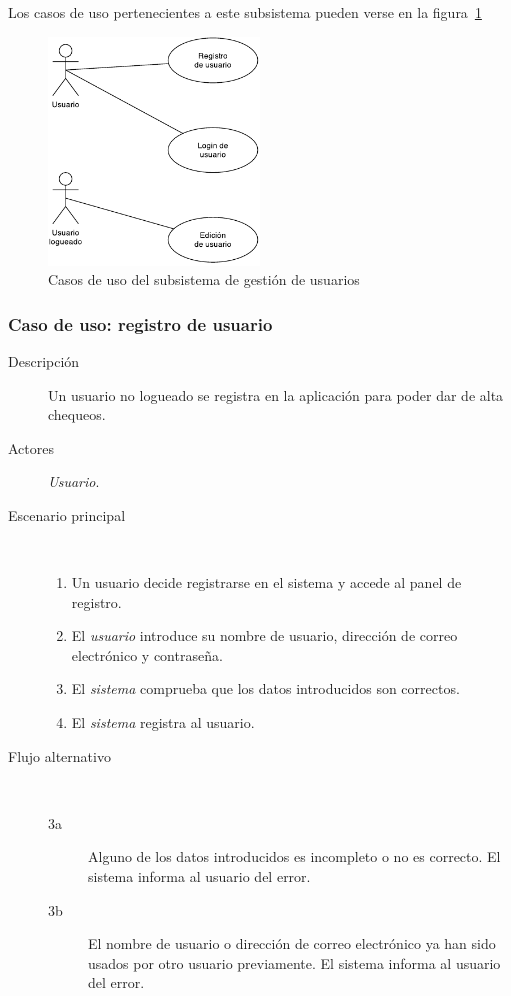 Los casos de uso pertenecientes a este subsistema pueden verse en la
figura~\ref{fig:subsistema-usuarios}

\begin{figure}[hp]
  \centering
  \includegraphics[width=0.5\textwidth]{4_analisis/diagrama_subsistema_gestion_usuarios}
  \caption{Casos de uso del subsistema de gestión de usuarios}
  \label{fig:subsistema-usuarios}
\end{figure}

\subsubsection{Caso de uso: registro de usuario}

\begin{description}
\item[Descripción] Un usuario no logueado se registra en la aplicación para poder dar de alta chequeos.
\item[Actores] \textit{Usuario}.
\item[Escenario principal] $\quad$
  \begin{enumerate}
  \item Un usuario decide registrarse en el sistema y accede al panel de registro.
  \item El \textit{usuario} introduce su nombre de usuario, dirección de correo electrónico y contraseña.
  \item El \textit{sistema} comprueba que los datos introducidos son correctos.
  \item El \textit{sistema} registra al usuario.
  \end{enumerate}
\item[Flujo alternativo] $\quad$
  \begin{description}
  \item[3a] Alguno de los datos introducidos es incompleto o no es correcto. El
    sistema informa al usuario del error.
  \item[3b] El nombre de usuario o dirección de correo electrónico ya han sido
    usados por otro usuario previamente. El sistema informa al usuario del error.
  \end{description}
\end{description}

